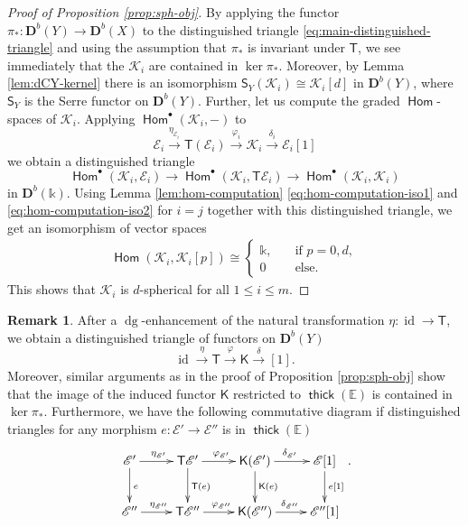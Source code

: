 \documentclass[a4paper,11pt, reqno]{amsart}
\def\E{\mathbb E}
\def\DD{\mathbf D}
\def\sE{\mathscr{E}}
\def\sK{\mathscr{K}}
\def\id{{\operatorname{id}}}
\def\dg{{\operatorname{dg}}}
\newcommand{\opname}[1]{\operatorname{\mathsf{#1}}}
\newcommand{\Hom}{\opname{Hom}}
\newcommand{\thick}{\opname{thick}\nolimits}
\def\Db{\DD^b}
\newcommand{\bK}{\mathsf{K}}
\newcommand{\bS}{\mathsf{S}}
\newcommand{\bT}{\mathsf{T}}
\theoremstyle{plain}
\theoremstyle{definition}
\newtheorem{remark}[dummy]{Remark}
\numberwithin{equation}{section}
\newlength{\arrow}
\begin{document}
    \begin{proof}[Proof of Proposition \ref{prop:sph-obj}] 
        By applying the functor $\pi_\ast : \Db(Y) \to \Db(X)$ to the distinguished triangle \eqref{eq:main-distinguished-triangle} and using the assumption that $\pi_\ast$ is invariant under $\bT$, we see immediately that the $\sK_i$ are contained in $\ker  \pi_\ast $.
        Moreover, by Lemma \ref{lem:dCY-kernel} there is an isomorphism $\bS_Y ( \sK_i ) \cong \sK_i [d]$ in $\Db(Y)$, where $\bS_Y$ is the Serre functor on $\Db(Y)$.
        Further, let us compute the graded $\Hom$-spaces of $\sK_i $.
        Applying $\Hom^\bullet ( \sK_i , - )$ to  
        \[
        \sE_i \xrightarrow{\eta_{\sE_i} } \bT ( \sE_i  ) \xrightarrow{\varphi_i } \sK_i \xrightarrow{\delta_i} \sE_i [1]
        \]
        we obtain a distinguished triangle
        \[
        \Hom^\bullet ( \sK_i , \sE_i  ) \to \Hom^\bullet ( \sK_i , \bT  \sE_i    ) \to \Hom^\bullet ( \sK_i , \sK_i  ) 
        \]
        in $\Db(\mathbb{k})$.
        Using Lemma \ref{lem:hom-computation} \eqref{eq:hom-computation-iso1} and \eqref{eq:hom-computation-iso2} for $i=j$ together with this distinguished triangle, we get an isomorphism of vector spaces
        \begin{align*}
\Hom  ( \sK_i  , \sK_i [p] ) \cong \begin{cases} \mathbb{k} , \quad & \text{if } p =   0 , d ,  \\ 
0 \quad & \text{else. }\end{cases}
\end{align*}
This shows that $\sK_i$ is $d$-spherical for all $1\leq i \leq m$.
    \end{proof}

    \begin{remark}\label{rmk:delta-commut}
    After a $\dg$-enhancement of the natural transformation $\eta \colon \id \to \bT$, we obtain a distinguished triangle of functors on $\Db(Y)$
    \[
    \id \xrightarrow{\eta} \bT \xrightarrow{\varphi} \bK \xrightarrow{\delta} [1] .
    \]
    Moreover, similar arguments as in the proof of Proposition \ref{prop:sph-obj} show that the image of the induced functor $\bK$ restricted to $\thick( \E) $ is contained in $\ker\pi_\ast$.
    Furthermore, we have the following commutative diagram if distinguished triangles for any morphism $e \colon \sE' \to \sE''$ is in $\thick ( \E )$
    \begin{equation*}\label{eq:E-TE-K}
\xymatrix{
    \sE'  \ar@{->}[d]^{e} \ar@{->}[r]^{\eta_{\sE'}} &  \bT \sE' \ar@{->}[d]^{\bT (e) } \ar@{->}[r]^{\varphi_{\sE'}} & \bK (\sE') \ar@{->}[d]^{\bK (e) } \ar@{->}[r]^{\delta_{\sE'}} & \sE [1] \ar@{->}[d]^{e[1]} \\
 \sE'' \ar@{->}[r]^{\eta_{\sE''}} & \bT \sE'' \ar@{->}[r]^{\varphi_{\sE''}} & \bK (\sE'') \ar@{->}[r]^{\delta_{\sE''}} & \sE'' [1] }.
\end{equation*}
\end{remark}
\end{document}
